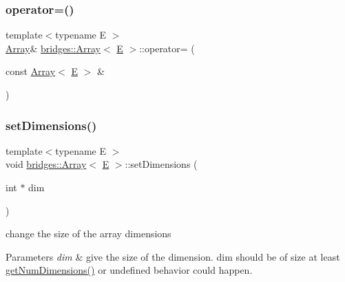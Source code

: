 \mbox{\label{classbridges_1_1_array_af8a8b4fc43f57020db39207c80403e6f}} 
\subsubsection{\texorpdfstring{operator=()}{operator=()}}
{\footnotesize\ttfamily template$<$typename E $>$ \\
\mbox{\hyperlink{classbridges_1_1_array}{Array}}\& \mbox{\hyperlink{classbridges_1_1_array}{bridges\+::\+Array}}$<$ \mbox{\hyperlink{namespacebridges_acfb0a4f7877d8f63de3e6862004c50eda3a3ea00cfc35332cedf6e5e9a32e94da}{E}} $>$\+::operator= (\begin{DoxyParamCaption}\item[{const \mbox{\hyperlink{classbridges_1_1_array}{Array}}$<$ \mbox{\hyperlink{namespacebridges_acfb0a4f7877d8f63de3e6862004c50eda3a3ea00cfc35332cedf6e5e9a32e94da}{E}} $>$ \&}]{ }\end{DoxyParamCaption})\hspace{0.3cm}{\ttfamily [delete]}}

\mbox{\label{classbridges_1_1_array_a4e179915ab7820bbafe9b3433656b182}} 
\subsubsection{\texorpdfstring{setDimensions()}{setDimensions()}}
{\footnotesize\ttfamily template$<$typename E $>$ \\
void \mbox{\hyperlink{classbridges_1_1_array}{bridges\+::\+Array}}$<$ \mbox{\hyperlink{namespacebridges_acfb0a4f7877d8f63de3e6862004c50eda3a3ea00cfc35332cedf6e5e9a32e94da}{E}} $>$\+::set\+Dimensions (\begin{DoxyParamCaption}\item[{int $\ast$}]{dim }\end{DoxyParamCaption})\hspace{0.3cm}{\ttfamily [inline]}}

change the size of the array dimensions 
\begin{DoxyParams}{Parameters}
{\em dim} & give the size of the dimension. dim should be of size at least \mbox{\hyperlink{classbridges_1_1_array_a31edfcff05dd4102fee1840ee915319e}{get\+Num\+Dimensions()}} or undefined behavior could happen. \\
\hline
\end{DoxyParams}
\mbox{\label{classbridges_1_1_array_aa4609a029a5c988c0bb2908030fd9dc5}} 
